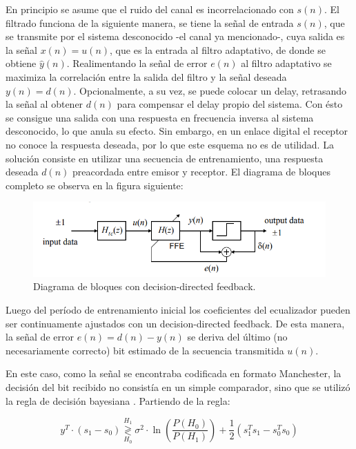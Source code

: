 \documentclass[main.tex]{subfiles}
\begin{document}
En principio se asume que el ruido del canal 
es incorrelacionado con $s(n)$.
El filtrado funciona de la siguiente manera, se tiene 
la señal de entrada $s(n)$, que se transmite por el sistema
desconocido -el canal ya mencionado-, cuya salida es la señal 
$x(n)=u(n)$, que es la entrada al filtro adaptativo, de donde se obtiene
$\hat{y}(n)$. Realimentando la señal de error $e(n)$
al filtro adaptativo se maximiza la correlación entre la salida del 
filtro y la señal deseada $y(n)=d(n)$.
Opcionalmente, a su vez, se puede colocar un delay, retrasando la señal al obtener 
$d(n)$ para compensar el delay propio del sistema.\newline
Con ésto se consigue una salida con una respuesta en frecuencia inversa
al sistema desconocido, lo que anula su efecto.\newline
Sin embargo, en un enlace digital el receptor no conoce la respuesta deseada, por lo que
este esquema no es de utilidad. La solución consiste en utilizar 
una secuencia de entrenamiento, una respuesta deseada $d(n)$ preacordada entre 
emisor y receptor.
El diagrama de bloques completo se observa en la figura siguiente:
\begin{figure}[h]
    \centering
    \includegraphics[scale=0.4]{imagenes/esquema.PNG}
    \caption{Diagrama de bloques con decision-directed feedback.}
\end{figure}
Luego del período de entrenamiento inicial los coeficientes del ecualizador pueden ser
 continuamente ajustados con un decision-directed feedback. De esta manera, 
 la señal de error $e(n)=d(n)-y(n)$ se deriva del último (no necesariamente correcto) 
 bit estimado de la secuencia transmitida $u(n)$. 
 
 En este caso, como la se\~nal se encontraba codificada en formato Manchester, la decisi\'on
 del bit recibido no consist\'ia en un simple comparador, sino que se utiliz\'o la regla de decisi\'on
 bayesiana . Partiendo de la regla:
 
 \begin{equation}
 	y^{T} \cdot (s_1 - s_0) \underset{H_0}{\overset{H_1}{\gtrless}} 
 	\sigma^2 \cdot \ln{\left( \frac{P(H_0)}{P(H_1)} \right)}
 	+ \frac{1}{2} \left( s_1^T s_1 - s_0^T s_0\right)
 \end{equation}
 
\end{document}
